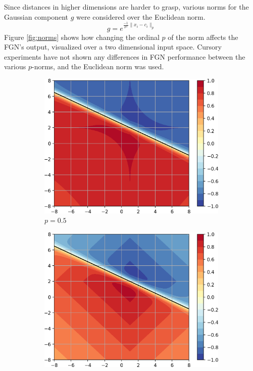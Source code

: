 \documentclass[12pt,oneside]{CUNY_PhD}
\begin{document}
Since distances in higher dimensions are harder to grasp, various norms for the Gaussian component $g$ were considered over the Euclidean norm.
\[g = e^{\frac{-1}{\sigma^2}\lVert x_i-c_i \lVert_p }\]
Figure \ref{fig:norms} shows how changing the ordinal $p$ of the norm affects the FGN's output, visualized over a two dimensional input space. Cursory experiments have not shown any differences in FGN performance between the various $p$-norms, and the Euclidean norm was used.
\begin{figure}[!t]
    \centering
    \begin{subfigure}[t]{0.32\textwidth}
        \includegraphics[width=\textwidth]{images/Variants-Norms/ord0.5-cropped.png}
        \caption*{$p=0.5$}
    \end{subfigure}
    \begin{subfigure}[t]{0.32\textwidth}
        \includegraphics[width=\textwidth]{images/Variants-Norms/ord1-cropped.png}

\end{subfigure}
\end{figure}
\end{document}
